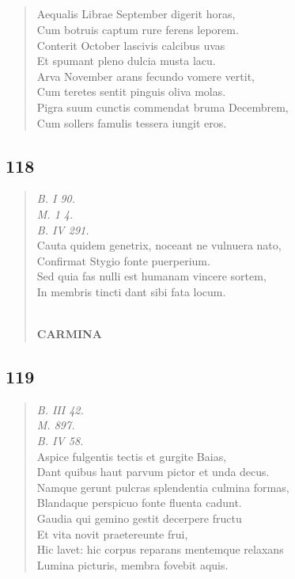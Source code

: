 \documentclass[11pt, a4paper]{report}
\begin{document}
            \subsection*{}
      \begin{verse}
      Aequalis Librae September digerit horas, \\ Cum botruis captum rure ferens leporem. \\ Conterit October lascivis calcibus uvas \\ Et spumant pleno dulcia musta lacu. \\ Arva November arans fecundo vomere vertit, \\ Cum teretes sentit pinguis oliva molas. \\ Pigra suum cunctis commendat bruma Decembrem, \\ Cum sollers famulis tessera iungit eros. \\ 
      \end{verse}
  
            \subsection*{118}
      \begin{verse}
      \textit{B. I 90.} \\ \textit{M. 1 4.} \\ \textit{B. IV 291.} \\ Cauta quidem genetrix, noceant ne vulnuera nato, \\ Confirmat Stygio fonte puerperium. \\ Sed quia fas nulli est humanam vincere sortem, \\ In membris tincti dant sibi fata locum. \\ 
        ﻿\pagebreak 
    \begin{center} \textbf{CARMINA} \end{center} \marginpar{[134]} 
      \end{verse}
  
            \subsection*{119}
      \begin{verse}
      \textit{B. III 42.} \\ \textit{M. 897.} \\ \textit{B. IV 58.} \\ Aspice fulgentis tectis et gurgite Baias, \\ Dant quibus haut parvum pictor et unda decus. \\ Namque gerunt pulcras splendentia culmina formas, \\ Blandaque perspicuo fonte fluenta cadunt. \\ Gaudia qui gemino gestit decerpere fructu \\ Et vita novit praetereunte frui, \\ Hic lavet: hic corpus reparans mentemque relaxans \\ Lumina picturis, membra fovebit aquis. \\ 
      \end{verse}
  
\end{document}
